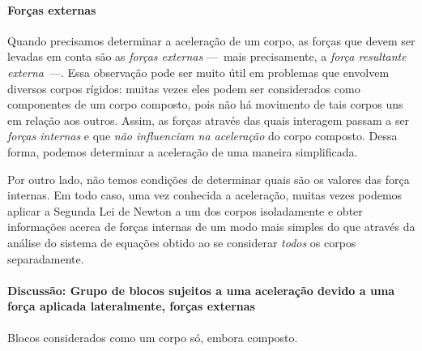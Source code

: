 \paragraph{Forças externas}

Quando precisamos determinar a aceleração de um corpo, as forças que devem ser levadas em conta são as \emph{forças externas} ---~mais precisamente, a \emph{força resultante externa}~---. Essa observação pode ser muito útil em problemas que envolvem diversos corpos rígidos: muitas vezes eles podem ser considerados como componentes de um corpo composto, pois não há movimento de tais corpos uns em relação aos outros. Assim, as forças através das quais interagem passam a ser \emph{forças internas} e que \emph{não influenciam na aceleração} do corpo composto. Dessa forma, podemos determinar a aceleração de uma maneira simplificada.

Por outro lado, não temos condições de determinar quais são os valores das força internas. Em todo caso, uma vez conhecida a aceleração, muitas vezes podemos aplicar a Segunda Lei de Newton a um dos corpos isoladamente e obter informações acerca de forças internas de um modo mais simples do que através da análise do sistema de equações obtido ao se considerar \emph{todos} os corpos separadamente.

\paragraph{Discussão: Grupo de blocos sujeitos a uma aceleração devido a uma força aplicada lateralmente, forças externas}

\begin{marginfigure}
\centering
{}
\caption{Blocos considerados como um corpo só, embora composto. \label{Fig:AcelBlocosPorForcaLateralForcasExternas}}
\end{marginfigure}

